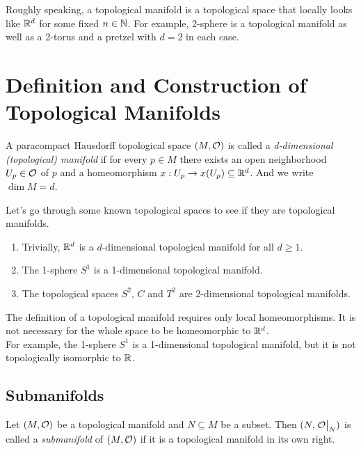 
Roughly speaking, a topological manifold is a topological space that locally looks like \(\mathbb R^d\) for some fixed \(n \in \mathbb N\). For example, 2-sphere is a topological manifold as well as a 2-torus and a pretzel with \(d = 2\) in each case.

\section{Definition and Construction of Topological Manifolds}

\begin{definition}
	A paracompact Hausdorff topological space \((M, \mathcal{O})\) is called a \emph{d-dimensional (topological) manifold} if for every \(p \in M\) there exists an open neighborhood \(U_p \in \mathcal{O}\) of \(p\) and a homeomorphism \(x: U_p \to x(U_p) \subseteq \mathbb R^d\). And we write \(\dim{M} = d\).
\end{definition}

\begin{example}
	Let's go through some known topological spaces to see if they are topological manifolds.
	\begin{enumerate}
		\item Trivially, \(\mathbb R^d\) is a \(d\)-dimensional topological manifold for all \(d \ge 1\).
		\item The 1-sphere \(S^1\) is a 1-dimensional topological manifold.
		\item The topological spaces \(S^2\), \(C\) and \(T^2\) are 2-dimensional topological manifolds.
	\end{enumerate}
\end{example}

\begin{remark}
	The definition of a topological manifold requires only local homeomorphisms. It is not necessary for the whole space to be homeomorphic to \(\mathbb R^d\). \\
	For example, the 1-sphere \(S^1\) is a 1-dimensional topological manifold, but it is not topologically isomorphic to \(\mathbb R\).
\end{remark}

\subsection{Submanifolds}

\begin{definition}[Submanifold]
	Let \((M, \mathcal{O})\) be a topological manifold and \(N \subseteq M\) be a subset. Then \((N, \eval{\O}_N)\) is called a \emph{submanifold} of \((M, \mathcal{O})\) if it is a topological manifold in its own right.
\end{definition}

